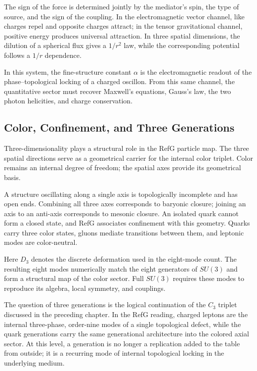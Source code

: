 \documentclass[11pt,a4paper]{article}
\begin{document}
The sign of the force is determined jointly by the mediator's spin, the type of source, and the sign of the coupling. In the electromagnetic vector channel, like charges repel and opposite charges attract; in the tensor gravitational channel, positive energy produces universal attraction. In three spatial dimensions, the dilution of a spherical flux gives a $1/r^2$ law, while the corresponding potential follows a $1/r$ dependence.

In this system, the fine-structure constant $\alpha$ is the electromagnetic readout of the phase--topological locking of a charged oscillon. From this same channel, the quantitative sector must recover Maxwell's equations, Gauss's law, the two photon helicities, and charge conservation.

\subsection{Color, Confinement, and Three Generations}

Three-dimensionality plays a structural role in the RefG particle map. The three spatial directions serve as a geometrical carrier for the internal color triplet. Color remains an internal degree of freedom; the spatial axes provide its geometrical basis.

A structure oscillating along a single axis is topologically incomplete and has open ends. Combining all three axes corresponds to baryonic closure; joining an axis to an anti-axis corresponds to mesonic closure. An isolated quark cannot form a closed state, and RefG associates confinement with this geometry. Quarks carry three color states, gluons mediate transitions between them, and leptonic modes are color-neutral.

Here $D_3$ denotes the discrete deformation used in the eight-mode count. The resulting eight modes numerically match the eight generators of $SU(3)$ and form a structural map of the color sector. Full $SU(3)$ requires these modes to reproduce its algebra, local symmetry, and couplings.

The question of three generations is the logical continuation of the $C_3$ triplet discussed in the preceding chapter. In the RefG reading, charged leptons are the internal three-phase, order-nine modes of a single topological defect, while the quark generations carry the same generational architecture into the colored axial sector. At this level, a generation is no longer a replication added to the table from outside; it is a recurring mode of internal topological locking in the underlying medium.
\end{document}
